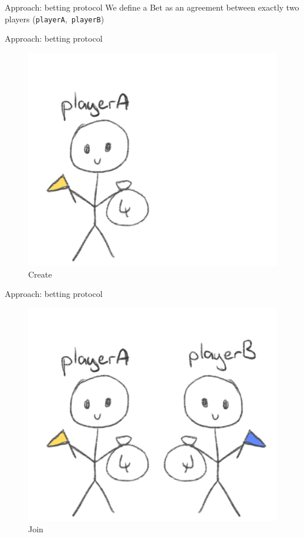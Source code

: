 \documentclass[aspectratio=169]{beamer}
\begin{document}
  \begin{frame}{Approach: betting protocol}
    We define a Bet as an agreement between exactly two players (\texttt{playerA},~\texttt{playerB})
  \end{frame}

  \begin{frame}{Approach: betting protocol}
    \begin{figure}
      \centering\includegraphics[scale=0.15]{img/0}
      \caption{Create}
    \end{figure}
  \end{frame}
  \begin{frame}{Approach: betting protocol}
    \begin{figure}
      \centering\includegraphics[scale=0.15]{img/1}
      \caption{Join}
    \end{figure}
  \end{frame}
\end{document}
